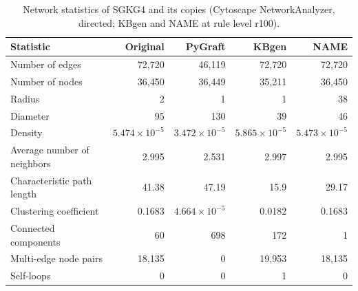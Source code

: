 \begin{table}[t]
\centering
\caption{Network statistics of SGKG4 and its copies (Cytoscape NetworkAnalyzer, directed; KBgen and NAME at rule level r100).}
\label{tab:cytoscape_SGKG4}
\begin{tabular}{lrrrr}
\toprule
Statistic & Original & PyGraft & KBgen & NAME \\
\midrule
Number of edges & 72{,}720 & 46{,}119 & 72{,}720 & 72{,}720 \\
Number of nodes & 36{,}450 & 36{,}449 & 35{,}211 & 36{,}450 \\
Radius & 2 & 1 & 1 & 38 \\
Diameter & 95 & 130 & 39 & 46 \\
Density & $5.474\times10^{-5}$ & $3.472\times10^{-5}$ & $5.865\times10^{-5}$ & $5.473\times10^{-5}$ \\
Average number of neighbors & 2.995 & 2.531 & 2.997 & 2.995 \\
Characteristic path length & 41.38 & 47.19 & 15.9 & 29.17 \\
Clustering coefficient & 0.1683 & $4.664\times10^{-5}$ & 0.0182 & 0.1683 \\
Connected components & 60 & 698 & 172 & 1 \\
Multi-edge node pairs & 18{,}135 & 0 & 19{,}953 & 18{,}135 \\
Self-loops & 0 & 0 & 1 & 0 \\
\bottomrule
\end{tabular}
\end{table}

